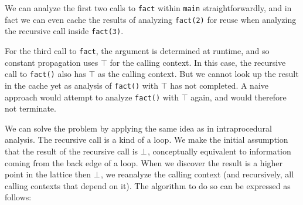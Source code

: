 \documentclass[11pt]{article}
\begin{document}
We can analyze the first two calls to \texttt{fact} within \texttt{main} straightforwardly, and in fact we can even
cache the results of analyzing \texttt{fact(2)} for reuse when analyzing the recursive call inside
\texttt{fact(3)}.

For the third call to \texttt{fact}, the argument is determined at runtime, and so constant propagation
uses $\top$ for the calling context. In this case, the recursive call to \texttt{fact()} also has $\top$ as the calling
context. But we cannot look up the result in the cache yet as analysis of \texttt{fact()} with $\top$ has not
completed. A naive approach would attempt to analyze \texttt{fact()} with $\top$ again, and would therefore
not terminate.

We can solve the problem by applying the same idea as in intraprocedural analysis.  The recursive call is a kind of a loop.  We make the initial assumption that the result of the recursive call is $\bot$, conceptually equivalent to information coming from the back edge of a loop.  When we discover the result is a higher point in the lattice then $\bot$, we reanalyze the calling context (and recursively, all calling contexts that depend on it).  The algorithm to do so can be expressed as follows:

\end{document}

